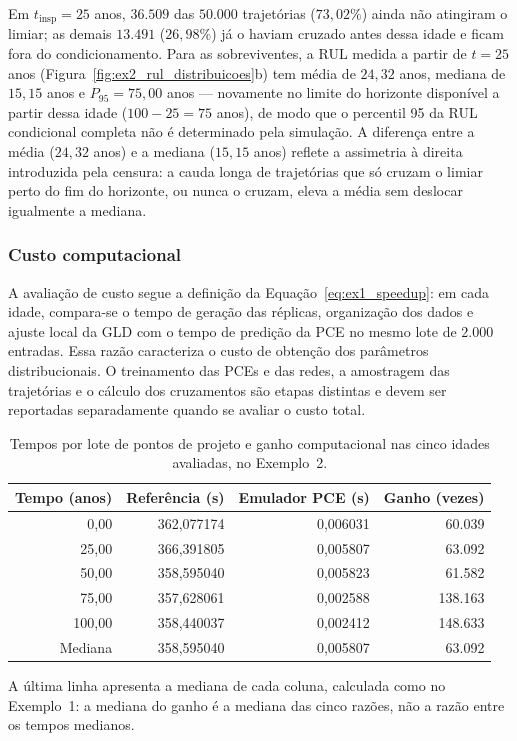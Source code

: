 Em $t_{\mathrm{insp}}=25$ anos, $36.509$ das $50.000$ trajetórias ($73{,}02\%$) ainda não atingiram o limiar; as demais $13.491$ ($26{,}98\%$) já o haviam cruzado antes dessa idade e ficam fora do condicionamento. Para as sobreviventes, a RUL medida a partir de $t=25$ anos (Figura~\ref{fig:ex2_rul_distribuicoes}b) tem média de $24{,}32$ anos, mediana de $15{,}15$ anos e $P_{95}=75{,}00$ anos --- novamente no limite do horizonte disponível a partir dessa idade ($100-25=75$ anos), de modo que o percentil 95 da RUL condicional completa não é determinado pela simulação. A diferença entre a média ($24{,}32$ anos) e a mediana ($15{,}15$ anos) reflete a assimetria à direita introduzida pela censura: a cauda longa de trajetórias que só cruzam o limiar perto do fim do horizonte, ou nunca o cruzam, eleva a média sem deslocar igualmente a mediana.

\subsubsection{Custo computacional}

A avaliação de custo segue a definição da Equação~\eqref{eq:ex1_speedup}: em cada idade, compara-se o tempo de geração das réplicas, organização dos dados e ajuste local da GLD com o tempo de predição da PCE no mesmo lote de $2.000$ entradas. Essa razão caracteriza o custo de obtenção dos parâmetros distribucionais. O treinamento das PCEs e das redes, a amostragem das trajetórias e o cálculo dos cruzamentos são etapas distintas e devem ser reportadas separadamente quando se avaliar o custo total.

\begin{table}[H]
\centering
\caption{Tempos por lote de pontos de projeto e ganho computacional nas cinco idades avaliadas, no Exemplo~2.}
\label{tab:computational_time_ex2}
\begin{tabular}{rrrr}
\toprule
Tempo (anos) & Referência (s) & Emulador PCE (s) & Ganho (vezes) \\
\midrule
0,00   & 362,077174 & 0,006031 & 60.039 \\
25,00  & 366,391805 & 0,005807 & 63.092 \\
50,00  & 358,595040 & 0,005823 & 61.582 \\
75,00  & 357,628061 & 0,002588 & 138.163 \\
100,00 & 358,440037 & 0,002412 & 148.633 \\
\midrule
Mediana & 358,595040 & 0,005807 & 63.092 \\
\bottomrule
\end{tabular}
\par\smallskip
\begin{minipage}{0.92\linewidth}
\footnotesize A última linha apresenta a mediana de cada coluna, calculada como no Exemplo~1: a mediana do ganho é a mediana das cinco razões, não a razão entre os tempos medianos.
\end{minipage}
\end{table}

